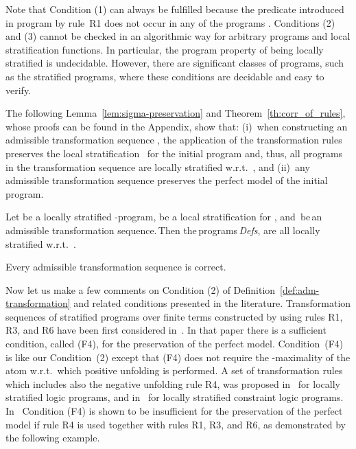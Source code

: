 \documentclass[english]{tlp}
\newcommand{\Mathit}[1]{\mbox{\it #1}}
\newcommand{\Defsn}{\Mathit{Defs}}
\begin{document}
Note that Condition (1) can always be fulfilled because the
predicate introduced in program  by rule~R1 does
not occur in any of the programs .
Conditions (2) and (3) cannot be checked in an algorithmic way for
arbitrary programs and local stratification functions. In particular,
the program property of being locally stratified is undecidable.
However, there are significant classes of programs, such as the 
stratified programs, where these conditions are decidable and easy to
verify.

The following Lemma~\ref{lem:sigma-preservation} and
Theorem~\ref{th:corr_of_rules}, whose proofs can be found in
the Appendix, show that: (i)~when constructing an
admissible transformation sequence , the application
of the transformation rules preserves the local
stratification~ for the initial program  and, thus, all
programs in the transformation sequence are locally stratified
w.r.t.~, and (ii)~any admissible transformation sequence
preserves the perfect model of the initial program.

\begin{lemma}
\label{lem:sigma-preservation} Let   be a locally stratified
-program,  be a local stratification for , and
\,be\,an\,admissible transformation sequence.\,Then
the\,programs\,\Defsn,  are all
locally stratified w.r.t.~.
\end{lemma}

\begin{theorem}\label{th:corr_of_rules} Every admissible transformation
sequence is correct.
\end{theorem}

Now let us make a few comments on Condition (2) of
Definition~\ref{def:adm-transformation} and related conditions
presented in the literature. Transformation sequences of stratified
programs over finite terms constructed by using rules R1, R3, and R6
have been first considered in~\cite{Sek91}. In that paper there is a
sufficient condition, called (F4), for the preservation of the
perfect model. Condition~(F4) is like our Condition~(2) except that (F4) 
does not require the -maximality of the atom w.r.t.~which positive
unfolding is performed. A set of transformation rules which includes
also the negative unfolding rule R4, was proposed in~\cite{PeP00a}
for locally stratified logic programs, and in~\cite{Fi&04a} for
locally stratified constraint logic programs. 
In~\cite{Sek09} Condition (F4) is shown
to be insufficient for the preservation of the perfect model if
rule R4 is used together with rules R1, R3, and R6, as demonstrated
by the following example.
\end{document}
